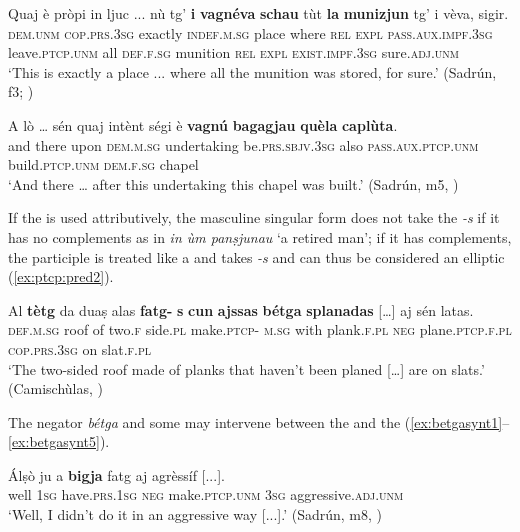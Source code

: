 \ea\label{ex:ptcp:agr3}
\gll  Quaj è pròpi in ljuc ... nù tg’ \textbf{i} \textbf{vagnéva} \textbf{schau} tùt \textbf{la} \textbf{munizjun} tg’ i vèva, sigir.\\
\textsc{dem.unm} \textsc{cop.prs.3sg} exactly \textsc{indef.m.sg} place {} where \textsc{rel} \textsc{expl} \textsc{pass.aux.impf.3sg} leave.\textsc{ptcp.unm} all \textsc{def.f.sg} munition \textsc{rel} \textsc{expl} \textsc{exist.impf.3sg} sure.\textsc{adj.unm}\\
\glt `This is exactly a place ... where all the munition was stored, for sure.' (Sadrún, f3; )
\z

\ea\label{ex:ptcp:agr5}
\gll    A lò … sén quaj intènt ségi è \textbf{vagnú} \textbf{bagagjau} \textbf{quèla} \textbf{caplùta}.\\
and there {} upon \textsc{dem.m.sg} undertaking be.\textsc{prs.sbjv.3sg} also \textsc{pass.aux.ptcp.unm} build.\textsc{ptcp.unm} \textsc{dem.f.sg} chapel \\
\glt `And there … after this undertaking this chapel was built.' (Sadrún, m5, )
\z

If the  is used attributively, the masculine singular form does not take the  \textit{-s} if it has no complements as in \textit{in ùm panṣjunau} `a retired man'; if it has complements, the participle is treated like a  and takes \textit{-s} and can thus be considered an elliptic  (\ref{ex:ptcp:pred2}).

\ea\label{ex:ptcp:pred2}
\gll  Al \textbf{tètg} da duaṣ alas \textbf{fatg-} \textbf{s} \textbf{cun} \textbf{ajssas} \textbf{bétga} \textbf{splanadas} […] aj sén latas.\\
\textsc{def.m.sg} roof of two.\textsc{f} side.\textsc{pl} make.\textsc{ptcp-} \textsc{m.sg} with plank.\textsc{f.pl} \textsc{neg}  plane.\textsc{ptcp.f.pl} {} \textsc{cop.prs.3sg} on slat.\textsc{f.pl}\\
\glt `The two-sided roof made of planks that haven't been planed […] are on slats.' (Camischùlas, )
\z

The negator \textit{bétga} and some  may intervene between the  and the  (\ref{ex:betgasynt1}--\ref{ex:betgasynt5}).

\ea\label{ex:betgasynt1}
\gll  Álṣò ju a \textbf{bigja} fatg aj agrèssíf [...].  \\
well \textsc{1sg} have.\textsc{prs.1sg} \textsc{neg} make.\textsc{ptcp.unm} \textsc{3sg} aggressive.\textsc{adj.unm}\\
\glt `Well, I didn’t do it in an aggressive way [...].' (Sadrún, m8, )
\z

